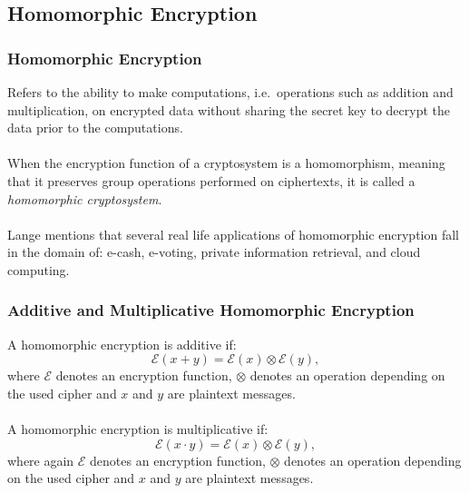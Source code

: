 \documentclass{beamer}
\begin{document}
\subsection{Homomorphic Encryption}
\begin{frame}
\frametitle{Homomorphic Encryption}
Refers to the ability to make computations, i.e.\ operations such as addition and multiplication, on encrypted data without sharing the secret key to decrypt the data prior to the computations. \\~\\

When the encryption function of a cryptosystem is a homomorphism, meaning that it preserves group operations performed on ciphertexts, it is called a \emph{homomorphic cryptosystem}. \\~\\

Lange \cite{lange2011} mentions that several real life applications of homomorphic encryption fall in the domain of: e-cash, e-voting, private information retrieval, and cloud computing.

\end{frame}

\begin{frame}
\frametitle{Additive and Multiplicative Homomorphic Encryption}

A homomorphic encryption is additive if:
\begin{equation}
\mathcal{E}(x+y) = \mathcal{E}(x)\otimes \mathcal{E}(y),
\end{equation}
where $\mathcal{E}$ denotes an encryption function, $\otimes$ denotes an operation depending on the used cipher and $x$ and $y$ are plaintext messages. \\~\\

A homomorphic encryption is multiplicative if:
\begin{equation}
\mathcal{E}(x \cdot y) = \mathcal{E}(x) \otimes \mathcal{E}(y),
\end{equation}
where again $\mathcal{E}$ denotes an encryption function, $\otimes$ denotes an operation depending on the used cipher and $x$ and $y$ are plaintext messages.

\end{frame}
\end{document}
